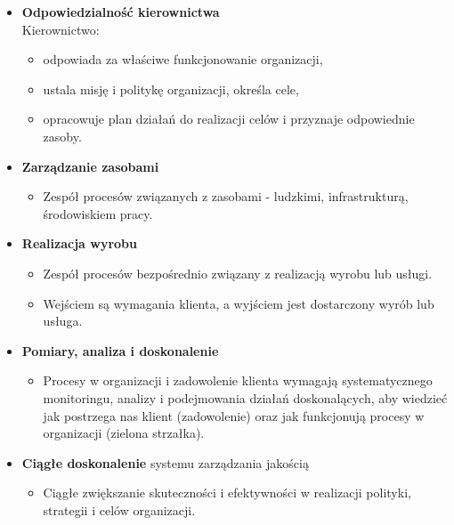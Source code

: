 \documentclass[a4paper]{article}
\begin{document}
    \begin{itemize}
        \item \textbf{Odpowiedzialność kierownictwa}\\
        Kierownictwo:
        \begin{itemize}
            \item odpowiada za właściwe funkcjonowanie organizacji,
            \item ustala misję i politykę organizacji, określa cele,
            \item opracowuje plan
            działań do realizacji celów i przyznaje odpowiednie zasoby.
        \end{itemize}
        \item \textbf{Zarządzanie zasobami}
        \begin{itemize}
            \item Zespół procesów związanych z zasobami - ludzkimi, infrastrukturą, środowiskiem pracy.
        \end{itemize}
        \item \textbf{Realizacja wyrobu}
        \begin{itemize}
            \item Zespół procesów bezpośrednio związany z
            realizacją wyrobu lub usługi.
            \item Wejściem są wymagania klienta, a wyjściem jest
            dostarczony wyrób lub usługa.
        \end{itemize}
        \item \textbf{Pomiary, analiza i doskonalenie}
        \begin{itemize}
            \item Procesy w organizacji i zadowolenie klienta
            wymagają systematycznego monitoringu, analizy i
            podejmowania działań doskonalących, aby wiedzieć
            jak postrzega nas klient (zadowolenie) oraz jak
            funkcjonują procesy w organizacji (zielona strzałka).
        \end{itemize}
        \item \textbf{Ciągłe doskonalenie} systemu zarządzania jakością
        \begin{itemize}
            \item Ciągłe zwiększanie skuteczności i efektywności w realizacji polityki,
            strategii i celów organizacji.
        \end{itemize}
    \end{itemize}
\end{document}

